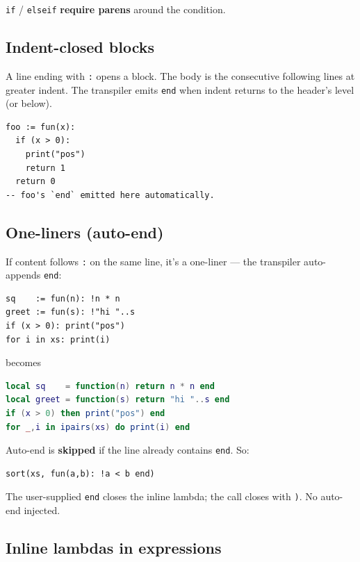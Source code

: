 \documentclass[10pt,twocolumn]{article}
\providecommand{\passthrough}[1]{#1}
\begin{document}
\passthrough{\lstinline!if!} / \passthrough{\lstinline!elseif!}
\textbf{require parens} around the condition.

\subsection{Indent-closed blocks}\label{indent-closed-blocks}

A line ending with \passthrough{\lstinline!:!} opens a block. The body
is the consecutive following lines at greater indent. The transpiler
emits \passthrough{\lstinline!end!} when indent returns to the header's
level (or below).

\begin{lstlisting}[language=Fun]
foo := fun(x):
  if (x > 0):
    print("pos")
    return 1
  return 0
-- foo's `end` emitted here automatically.
\end{lstlisting}

\subsection{One-liners (auto-end)}\label{one-liners-auto-end}

If content follows \passthrough{\lstinline!:!} on the same line, it's a
one-liner --- the transpiler auto-appends \passthrough{\lstinline!end!}:

\begin{lstlisting}[language=Fun]
sq    := fun(n): !n * n
greet := fun(s): !"hi "..s
if (x > 0): print("pos")
for i in xs: print(i)
\end{lstlisting}

becomes

\begin{lstlisting}[language=Lua]
local sq    = function(n) return n * n end
local greet = function(s) return "hi "..s end
if (x > 0) then print("pos") end
for _,i in ipairs(xs) do print(i) end
\end{lstlisting}

Auto-end is \textbf{skipped} if the line already contains
\passthrough{\lstinline!end!}. So:

\begin{lstlisting}[language=Fun]
sort(xs, fun(a,b): !a < b end)
\end{lstlisting}

The user-supplied \passthrough{\lstinline!end!} closes the inline
lambda; the call closes with \passthrough{\lstinline!)!}. No auto-end
injected.

\subsection{Inline lambdas in
expressions}\label{inline-lambdas-in-expressions}
\end{document}

